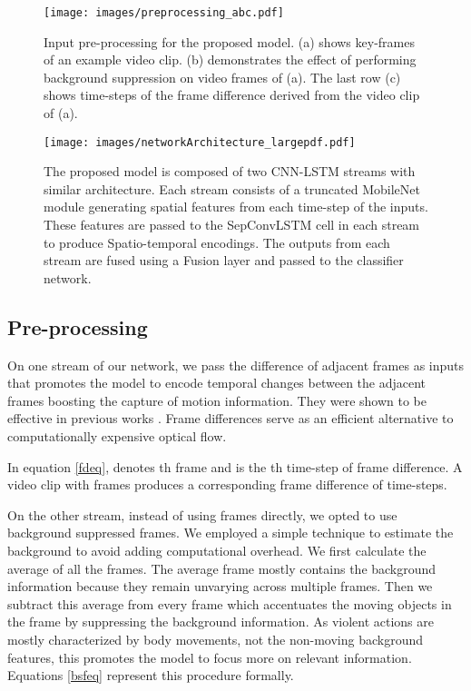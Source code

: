 \documentclass[conference]{IEEEtran}
\begin{document}
\begin{figure}[t]
\centering
\texttt{[image: images/preprocessing\_abc.pdf]}
\caption{Input pre-processing for the proposed model. (a) shows key-frames of an example video clip. (b) demonstrates the effect of performing background suppression on video frames of (a). The last row (c) shows time-steps of the frame difference derived from the video clip of (a). }
\label{fig:preprocessing}
\end{figure}

\begin{figure*}[t] 
\centering
\texttt{[image: images/networkArchitecture\_largepdf.pdf]}   \caption{The proposed model is composed of two CNN-LSTM streams with similar architecture. Each stream consists of a truncated MobileNet module generating spatial features from each time-step of the inputs. These features are passed to the SepConvLSTM cell in each stream to produce Spatio-temporal encodings. The outputs from each stream are fused using a Fusion layer and passed to the classifier network. }
\label{fig:architecture}
\end{figure*}



\subsection{Pre-processing}
On one stream of our network, we pass the difference of adjacent frames as inputs that promotes the model to encode temporal changes between the adjacent frames boosting the capture of motion information. They were shown to be effective in previous works \cite{sudhakaran2017learning, hanson2018bidirectional}. Frame differences serve as an efficient alternative to computationally expensive optical flow.

In equation \ref{fdeq},  denotes th frame and  is the th time-step of frame difference. A video clip with  frames produces a corresponding frame difference of   time-steps.


On the other stream, instead of using frames directly, we opted to use background suppressed frames. We employed a simple technique to estimate the background to avoid adding computational overhead. We first calculate the average of all the frames. The average frame mostly contains the background information because they remain unvarying across multiple frames. Then we subtract this average from every frame which accentuates the moving objects in the frame by suppressing the background information. As violent actions are mostly characterized by body movements, not the non-moving background features, this promotes the model to focus more on relevant information. Equations \ref{bsfeq} represent this procedure formally. 
\end{document}
